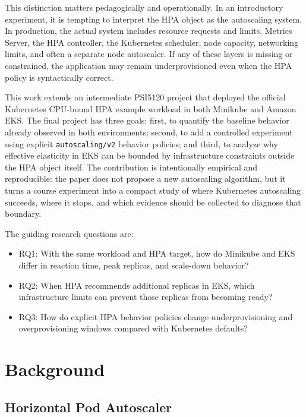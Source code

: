 \documentclass[conference]{IEEEtran}
\begin{document}
This distinction matters pedagogically and operationally. In an introductory experiment, it is tempting to interpret the HPA object as the autoscaling system. In production, the actual system includes resource requests and limits, Metrics Server, the HPA controller, the Kubernetes scheduler, node capacity, networking limits, and often a separate node autoscaler. If any of these layers is missing or constrained, the application may remain underprovisioned even when the HPA policy is syntactically correct.

This work extends an intermediate PSI5120 project that deployed the official Kubernetes CPU-bound HPA example workload in both Minikube and Amazon EKS. The final project has three goals: first, to quantify the baseline behavior already observed in both environments; second, to add a controlled experiment using explicit \texttt{autoscaling/v2} behavior policies; and third, to analyze why effective elasticity in EKS can be bounded by infrastructure constraints outside the HPA object itself. The contribution is intentionally empirical and reproducible: the paper does not propose a new autoscaling algorithm, but it turns a course experiment into a compact study of where Kubernetes autoscaling succeeds, where it stops, and which evidence should be collected to diagnose that boundary.

The guiding research questions are:

\begin{itemize}
  \item RQ1: With the same workload and HPA target, how do Minikube and EKS differ in reaction time, peak replicas, and scale-down behavior?
  \item RQ2: When HPA recommends additional replicas in EKS, which infrastructure limits can prevent those replicas from becoming ready?
  \item RQ3: How do explicit HPA behavior policies change underprovisioning and overprovisioning windows compared with Kubernetes defaults?
\end{itemize}

\section{Background}

\subsection{Horizontal Pod Autoscaler}
\end{document}
